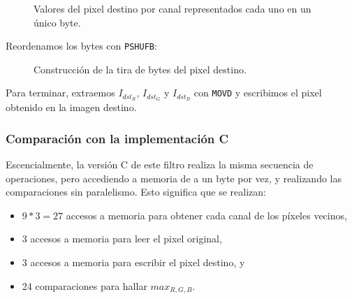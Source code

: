 \begin{figure}[H]
    \centering
    \caption{Valores del pixel destino por canal representados cada uno en un único byte.}
\end{figure}

Reordenamos los bytes con \texttt{PSHUFB}:

\begin{figure}[H]
    \centering
    \caption{Construcción de la tira de bytes del pixel destino.}
\end{figure}

Para terminar, extraemos $I_{dst_R}$, $I_{dst_G}$ y $I_{dst_B}$ con \texttt{MOVD}
y escribimos el pixel obtenido en la imagen destino.




\subsubsection{Comparación con la implementación C}

Escencialmente, la versión C de este filtro realiza la misma secuencia de operaciones,
pero accediendo a memoria de a un byte por vez, y realizando las comparaciones
sin paralelismo. Esto significa que se realizan:

\begin{itemize}
    \item $9 * 3 = 27$ accesos a memoria para obtener cada canal de los píxeles vecinos,
    \item 3 accesos a memoria para leer el pixel original,
    \item 3 accesos a memoria para escribir el pixel destino, y
    \item 24 comparaciones para hallar $max_{R,G,B}$.
\end{itemize}

